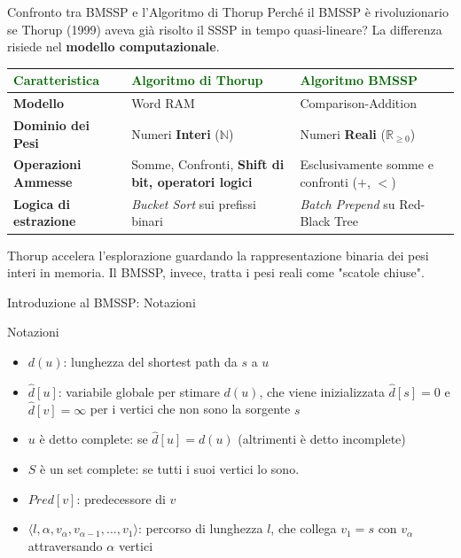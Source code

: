 \documentclass[aspectratio=169]{beamer}
\begin{document}
\begin{frame}{Confronto tra BMSSP e l'Algoritmo di Thorup}
    Perché il BMSSP è rivoluzionario se Thorup (1999) aveva già risolto il SSSP in tempo quasi-lineare? La differenza risiede nel \textbf{modello computazionale}.
   \vspace{-0.3cm}
    \begin{table}[]
        \centering
        \renewcommand{\arraystretch}{1.5}
        \begin{tabular}{|p{3.8cm}|p{4.5cm}|p{4.5cm}|}
        \hline
        \textbf{\textcolor{darkgreen}{Caratteristica}} & \textbf{\textcolor{darkgreen}{Algoritmo di Thorup}} & \textbf{\textcolor{darkgreen}{Algoritmo BMSSP}} \\ \hline
        \textbf{Modello} & Word RAM & Comparison-Addition \\ \hline
        \textbf{Dominio dei Pesi} & Numeri \textbf{Interi} ($\mathbb{N}$) & Numeri \textbf{Reali} ($\mathbb{R}_{\ge 0}$) \\ \hline
        \textbf{Operazioni Ammesse} & Somme, Confronti, \textbf{Shift di bit, operatori logici} & Esclusivamente somme e confronti ($+$, $<$) \\ \hline
        \textbf{Logica di estrazione} & \textit{Bucket Sort} sui prefissi binari & \textit{Batch Prepend} su Red-Black Tree \\ \hline
        \end{tabular}
    \end{table}
        Thorup accelera l'esplorazione guardando la rappresentazione binaria dei pesi interi in memoria. Il BMSSP, invece, tratta i pesi reali come "scatole chiuse".
\end{frame}

\begin{frame}{Introduzione al BMSSP: Notazioni}
    \begin{block}{Notazioni}
    \begin{itemize}
        \item $d(u)$: lunghezza del shortest path da $s$ a $u$
        \item $\hat{d}[u]$: variabile globale per stimare $d(u)$, che viene inizializzata $\hat{d}[s]=0$ e $\hat{d}[v]=\infty$ per i vertici che non sono la sorgente $s$
        \item $u$ è detto complete: se $\hat{d}[u] = d(u)$ (altrimenti è detto incomplete)
        \item $S$ è un set complete: se tutti i suoi vertici lo sono.
        \item $Pred[v]$: predecessore di $v$
        \item $\langle l,\alpha,v_\alpha,v_{\alpha-1},...,v_1 \rangle$: percorso di lunghezza $l$, che collega $v_1 = s$ con $v_\alpha$ attraversando $\alpha$ vertici
    \end{itemize}
    \end{block}
\end{frame}
\end{document}
